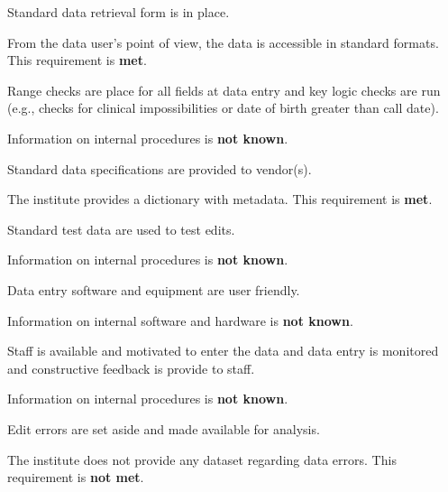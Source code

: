 \begin{QandA}
    \item Standard data retrieval form is in place.
    \begin{answered}
        From the data user's point of view, the data is accessible in standard formats.
        This requirement is \textbf{met}.
    \end{answered}

    \item Range checks are place for all fields at data entry and key logic checks are run (e.g., checks for clinical impossibilities or date of birth greater than call date).
    \begin{answered}
        Information on internal procedures is \textbf{not known}.
    \end{answered}

    \item Standard data specifications are provided to vendor(s).
    \begin{answered}
        The institute provides a dictionary with metadata.
        This requirement is \textbf{met}.
    \end{answered}

    \item Standard test data are used to test edits.
    \begin{answered}
        Information on internal procedures is \textbf{not known}.
    \end{answered}

    \item Data entry software and equipment are user friendly.
    \begin{answered}
        Information on internal software and hardware is \textbf{not known}.
    \end{answered}

    \item Staff is available and motivated to enter the data and data entry is monitored and constructive feedback is provide to staff.
    \begin{answered}
        Information on internal procedures is \textbf{not known}.
    \end{answered}

    \item Edit errors are set aside and made available for analysis.
    \begin{answered}
        The institute does not provide any dataset regarding data errors.
        This requirement is \textbf{not met}.
    \end{answered}


\end{QandA}
